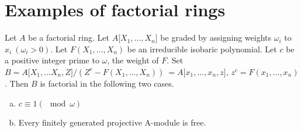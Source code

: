 \section{Examples of factorial rings}\label{chap1:sec8}%
  
\begin{theorem}\label{chap1:thm8.1} %
Let $A$ be a factorial ring. Let $A \big[X_1 , \ldots , X_n \big]$ be
graded by assigning weights $\omega_i$ to $x_i ~ (\omega_i > 
  0)$. Let $F(X_1, \ldots ,  X_n)$ be an irreducible isobaric
  polynomial. Let $c$ be a positive integer prime to $\omega$, the
  weight of $F$. Set $B = A \big[X_1 , \ldots X_n, Z\big ]/(Z^c
  - F(X_1, \ldots , X_n)) ~ = A \big [x_1, \ldots , x_n, z\big ]$, $z^c
  = F(x_1, \ldots , x_n)$. Then $B$ is factorial in the following two
  cases. 
\begin{enumerate}[(a)]
\item $c \equiv 1 (\mod \omega)$

\item Every finitely generated projective A-module is free.
\end{enumerate}    
\end{theorem}   
     
